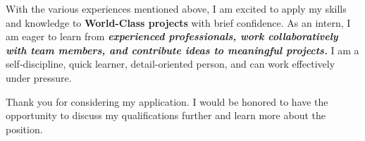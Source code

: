 With the various experiences mentioned above, I am excited to apply my skills and knowledge to \textbf{World-Class projects} with brief confidence. As an intern, I am eager to learn from \textbf{\emph{experienced professionals, work collaboratively with team members, and contribute ideas to meaningful projects.}} I am a self-discipline, quick learner, detail-oriented person, and can work effectively under pressure.

Thank you for considering my application. I would be honored to have the opportunity to discuss my qualifications further and learn more about the position.